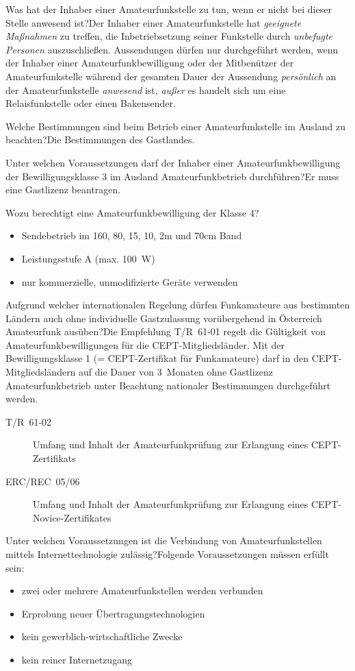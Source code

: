 \documentclass[avery5371,grid,frame,a4paper]{flashcards}
\newcommand{\card}[3]{
  \begin{flashcard}[{\chap} -- #1]{#2}#3\end{flashcard}
}
\begin{document}
\card{56}{Was hat der Inhaber einer Amateurfunkstelle zu tun, wenn er nicht bei dieser Stelle anwesend ist?}{Der Inhaber einer Amateurfunkstelle hat \emph{geeignete Maßnahmen} zu treffen, die Inbetriebsetzung seiner Funkstelle durch \emph{unbefugte Personen} auszuschließen. Aussendungen dürfen nur durchgeführt werden, wenn der Inhaber einer Amateurfunkbewilligung oder der Mitbenützer der Amateurfunkstelle während der gesamten Dauer der Aussendung \emph{persönlich} an der Amateurfunkstelle \emph{anwesend} ist, \emph{außer} es handelt sich um eine Relaisfunkstelle oder einen Bakensender.}

\card{57}{Welche Bestimmungen sind beim Betrieb einer Amateurfunkstelle im Ausland zu beachten?}{Die Bestimmungen des Gastlandes.}

\card{58}{Unter welchen Voraussetzungen darf der Inhaber einer Amateurfunkbewilligung der Bewilligungsklasse 3 im Ausland Amateurfunkbetrieb durchführen?}{Er muss eine Gastlizenz beantragen.}

\card{59}{Wozu berechtigt eine Amateurfunkbewilligung der Klasse 4?}{\begin{itemize}
  \item Sendebetrieb im 160, 80, 15, 10, 2m und 70cm Band
  \item Leistungsstufe A (max. 100~W)
  \item nur kommerzielle, unmodifizierte Geräte verwenden
\end{itemize}}

\card{60}{Aufgrund welcher internationalen Regelung dürfen Funkamateure aus bestimmten Ländern auch ohne individuelle Gastzulassung vorübergehend in Österreich Amateurfunk ausüben?}{\small Die Empfehlung T/R~61-01 regelt die Gültigkeit von Amateurfunkbewilligungen für die CEPT-Mitgliedsländer. Mit der Bewilligungsklasse 1 (= CEPT-Zertifikat für Funkamateure) darf in den CEPT-Mitgliedsländern auf die Dauer von 3~Monaten ohne Gastlizenz Amateurfunkbetrieb unter Beachtung nationaler Bestimmungen durchgeführt werden.

\begin{description}
  \item[T/R~61-02] Umfang und Inhalt der Amateurfunkprüfung zur Erlangung eines CEPT-Zertifikats
  \item[ERC/REC~05/06] Umfang und Inhalt der Amateurfunkprüfung zur Erlangung eines CEPT-Novice-Zertifikates
\end{description}
}

\card{61}{Unter welchen Voraussetzungen ist die Verbindung von Amateurfunkstellen mittels Internettechnologie zulässig?}{Folgende Voraussetzungen müssen erfüllt sein:
\begin{itemize}
  \item zwei oder mehrere Amateurfunkstellen werden verbunden
  \item Erprobung neuer Übertragungstechnologien
  \item kein gewerblich-wirtschaftliche Zwecke
  \item kein reiner Internetzugang
\end{itemize}}
\end{document}
